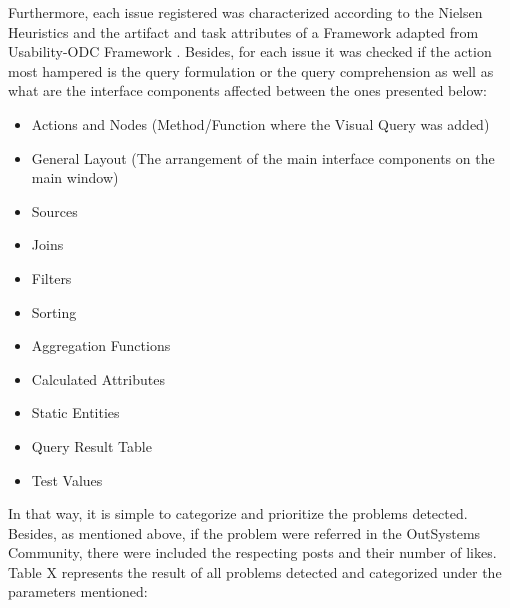 Furthermore, each issue registered was characterized according to the Nielsen Heuristics \cite{nielsen_heuristics} and the artifact and task attributes of a Framework adapted from Usability-ODC Framework \cite{in_process_usability_problem_classification_analysis_improvement}. Besides, for each issue it was checked if the action most hampered is the query formulation or the query comprehension as well as what are the interface components affected between the ones presented below:

\begin{itemize}
    \item Actions and Nodes (Method/Function where the Visual Query was added)
    \item General Layout (The arrangement of the main interface components on the main window)
    \item Sources
    \item Joins
    \item Filters
    \item Sorting
    \item Aggregation Functions
    \item Calculated Attributes
    \item Static Entities
    \item Query Result Table
    \item Test Values
\end{itemize}

In that way, it is simple to categorize and prioritize the problems detected. Besides, as mentioned above, if the problem were referred in the OutSystems Community, there were included the respecting posts and their number of likes. Table X represents the result of all problems detected and categorized under the parameters mentioned:

